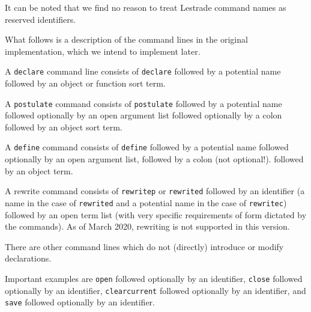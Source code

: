 \documentclass[12pt]{article}
\begin{document}
It can be noted that we find no reason to treat Lestrade command names as reserved identifiers.

What follows is a description of the command lines in the original implementation, which we intend to implement later.

A {\tt declare} command line consists of {\tt declare} followed by a potential name followed by an object or function sort term.

A {\tt postulate} command consists of {\tt postulate} followed by a potential name followed optionally by an open argument list followed optionally by a colon followed by an object sort term.

A {\tt define} command consists of {\tt define} followed by a potential name followed optionally by an open argument list, followed by a colon (not optional!). followed by an object term.

A rewrite command consists of {\tt rewritep} or {\tt rewrited} followed by an identifier (a name in the case of {\tt rewrited} and a potential name in the case of {\tt rewritec}) followed by
an open term list (with very specific requirements of form dictated by the commands).  As of March 2020, rewriting is not supported in this version.

There are other command lines which do not (directly) introduce or modify declarations.

Important examples are {\tt open} followed optionally by an identifier, {\tt close} followed optionally by an identifier, {\tt clearcurrent} followed optionally by an identifier, and
{\tt save} followed optionally by an identifier.
\end{document}
